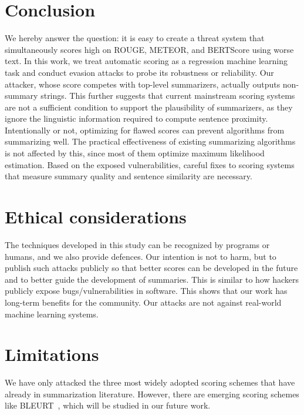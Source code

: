 \documentclass[11pt]{article}
\theoremstyle{remark}
\begin{document}
\section{Conclusion}
We hereby answer the question: it is easy to create a threat system that simultaneously scores high on ROUGE, METEOR, and BERTScore using worse text. In this work, we treat automatic scoring as a regression machine learning task and conduct evasion attacks to probe its robustness or reliability. Our attacker, whose score competes with top-level summarizers, actually outputs non-summary strings. This further suggests that current mainstream scoring systems are not a sufficient condition to support the plausibility of summarizers, as they ignore the linguistic information required to compute sentence proximity. Intentionally or not, optimizing for flawed scores can prevent algorithms from summarizing well. The practical effectiveness of existing summarizing algorithms is not affected by this, since most of them optimize maximum likelihood estimation. Based on the exposed vulnerabilities, careful fixes to scoring systems that measure summary quality and sentence similarity are necessary.

\section*{Ethical considerations}
The techniques developed in this study can be recognized by programs or humans, and we also provide defences. Our intention is not to harm, but to publish such attacks publicly so that better scores can be developed in the future and to better guide the development of summaries. This is similar to how hackers publicly expose bugs/vulnerabilities in software. This shows that our work has long-term benefits for the community. Our attacks are not against real-world machine learning systems.

\section*{Limitations}
We have only attacked the three most widely adopted scoring schemes that have already in summarization literature. However, there are emerging scoring schemes like BLEURT~\cite{sellam-etal-2020-bleurt}, which will be studied in our future work.







\end{document}
